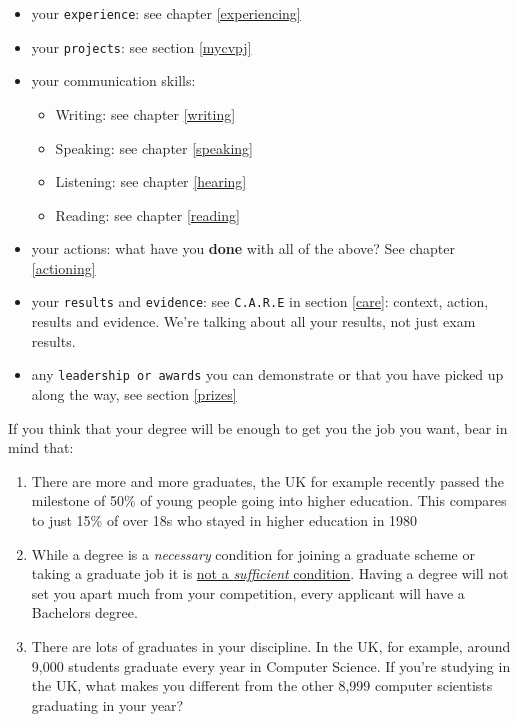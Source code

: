 \documentclass[
]{book}
\providecommand{\tightlist}{%
  \setlength{\itemsep}{0pt}\setlength{\parskip}{0pt}}
\begin{document}
\begin{itemize}
\tightlist
\item
  your \texttt{experience}: see chapter \ref{experiencing}
\item
  your \texttt{projects}: see section \ref{mycvpj}
\item
  your communication skills:

  \begin{itemize}
  \tightlist
  \item
    Writing: see chapter \ref{writing}
  \item
    Speaking: see chapter \ref{speaking}
  \item
    Listening: see chapter \ref{hearing}
  \item
    Reading: see chapter \ref{reading}
  \end{itemize}
\item
  your actions: what have you \textbf{done} with all of the above? See chapter \ref{actioning}
\item
  your \texttt{results} and \texttt{evidence}: see \texttt{C.A.R.E} in section \ref{care}: context, action, results and evidence. We're talking about all your results, not just exam results.
\item
  any \texttt{leadership\ or\ awards} you can demonstrate or that you have picked up along the way, see section \ref{prizes}
\end{itemize}

If you think that your degree will be enough to get you the job you want, bear in mind that:

\begin{enumerate}
\def\labelenumi{\arabic{enumi}.}
\tightlist
\item
  There are more and more graduates, the UK for example recently passed the milestone of 50\% of young people going into higher education. This compares to just 15\% of over 18s who stayed in higher education in 1980 \citep{lotsofgrads}
\item
  While a degree is a \emph{necessary} condition for joining a graduate scheme or taking a graduate job it is \href{https://en.wikipedia.org/wiki/Necessity_and_sufficiency}{not a \emph{sufficient} condition}. Having a degree will not set you apart much from your competition, every applicant will have a Bachelors degree.
\item
  There are lots of graduates in your discipline. In the UK, for example, around 9,000 students graduate every year in Computer Science. If you're studying in the UK, what makes you different from the other 8,999 computer scientists graduating in your year?
\end{enumerate}
\end{document}
